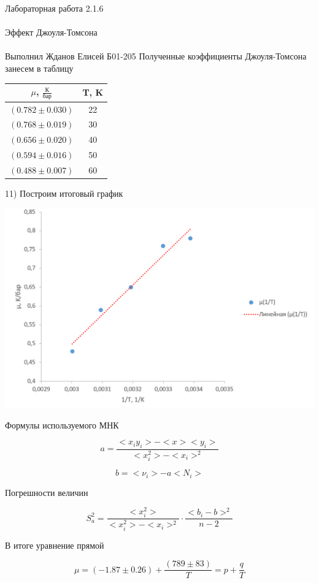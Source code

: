 \documentclass{astroedu-lab}
\begin{document}
\begin{problem}{\huge Лабораторная работа 2.1.6\\\\Эффект Джоуля-Томсона\\\\Выполнил Жданов Елисей Б01-205}
Полученные коэффициенты Джоуля-Томсона занесем в таблицу

\begin{center}
\begin{tabular}{|c|c|}
\hline
$\mu$, $\frac{\text{К}}{\text{бар}}$ & T, K \\ \hline
$(0.782 \pm 0.030)$ & 22 \\
$(0.768 \pm 0.019)$ & 30 \\
$(0.656 \pm 0.020)$ & 40 \\
$(0.594 \pm 0.016)$ & 50 \\
$(0.488 \pm 0.007)$ & 60 \\
\hline
\end{tabular}
\end{center}

11) Построим итоговый график

\begin{center}
\includegraphics[width=1\textwidth]{main_plot.png}
\label{ris:image}
\end{center}

Формулы используемого МНК

\[
	a = \frac{<x_i y_i> - < x > < y_i >}{< x_i^2> - < x_i >^2}
\]

\[
	b = < \nu_i > - a < N_i >
\]

Погрешности величин

\begin{equation}
	S_a^2 = \frac{< x_i^2>}{< x_i^2 > - < x_i >^2} \cdot \frac{<  b_i - b > ^2}{n - 2}
\end{equation}

В итоге уравнение прямой 

\begin{equation}
	\mu = (-1.87 \pm 0.26) + \frac{(789 \pm 83)}{T} = p + \frac{q}{T}
\end{equation}


\end{problem}
\end{document}
